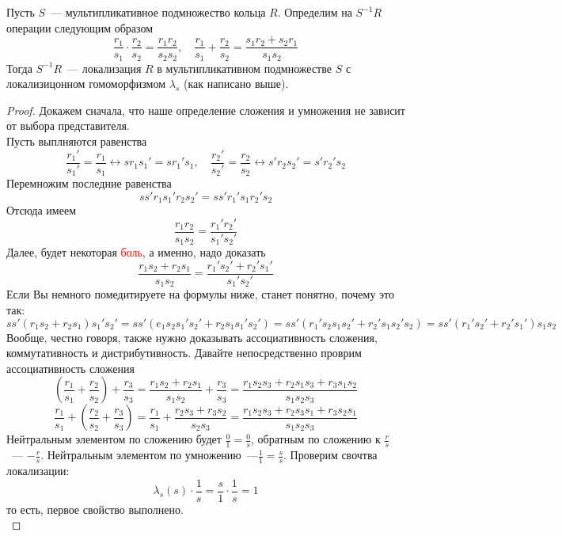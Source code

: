 \documentclass[11pt]{report}
\begin{document}
    \begin{theorem}
        Пусть $S$~--- мультипликативное подмножество кольца $R$. Определим на $S^{-1}R$ операции следующим образом
        \[ \frac{r_1}{s_1} \cdot \frac{r_2}{s_2} = \frac{r_1 r_2}{s_2 s_2}, \quad \frac{r_1}{s_1} + \frac{r_2}{s_2} = \frac{s_1 r_2 + s_2 r_1}{s_1 s_2} \]
        Тогда $S^{-1}R$~--- локализация $R$ в мультипликативном подмножестве $S$ с локализицонном гомоморфизмом $\lambda_s$ (как написано выше).
    \end{theorem}
    \begin{proof}
        Докажем сначала, что наше определение сложения и умножения не зависит от выбора представителя. \\
        Пусть выплняются равенства
        \[ \frac{r_1'}{s_1'} = \frac{r_1}{s_1} \leftrightarrow s r_1 s_1' = s r_1' s_1, \quad \frac{r_2'}{s_2'} = \frac{r_2}{s_2} \leftrightarrow s' r_2 s_2' = s' r_2' s_2 \]
        Перемножим последние равенства
        \[ s s' r_1 s_1' r_2 s_2' = s s' r_1' s_1 r_2' s_2 \]
        Отсюда имеем
        \[ \frac{r_1 r_2}{s_1 s_2} = \frac{r_1' r_2'}{s_1' s_2'} \]
        Далее, будет некоторая \textcolor{red}{боль}, а именно, надо доказать
        \[ \frac{r_1 s_2 + r_2 s_1}{s_1 s_2} = \frac{r_1' s_2' + r_2' s_1' }{s_1' s_2'} \]
        Если Вы немного помедитируете на формулы ниже, станет понятно, почему это так:
        \[ ss' (r_1 s_2 + r_2 s_1) s_1' s_2' = s s' (e_1 s_2 s_1' s_2' + r_2 s_1 s_1' s_2') =
        s s' (r_1' s_2 s_1 s_2' + r_2' s_1 s_2' s_2) = s s' (r_1' s_2' + r_2' s_1') s_1 s_2 \]
        Вообще, честно говоря, также нужно доказывать ассоциативность сложения, коммутативность и дистрибутивность.
        Давайте непосредственно проврим ассоциативность сложения
        \[ \left( \frac{r_1}{s_1} + \frac{r_2}{s_2} \right) + \frac{r_3}{s_3} = \frac{r_1 s_2 + r_2 s_1}{s_1 s_2} + \frac{r_3}{s_3} = \frac{r_1 s_2 s_3 + r_2 s_1 s_3 + r_3 s_1 s_2}{s_1 s_2 s_3} \]
        \[ \frac{r_1}{s_1} + \left( \frac{r_2}{s_2} + \frac{r_3}{s_3} \right) = \frac{r_1}{s_1} + \frac{r_2 s_3 + r_3 s_2}{s_2 s_3} = \frac{r_1 s_2 s_3 + r_2 s_3 s_1 + r_3 s_2 s_1}{s_1 s_2 s_3}\]
        Нейтральным элементом по сложению будет $\frac{0}{1} = \frac{0}{s}$, обратным по сложению к $\frac{r}{s}$~--- $-\frac{r}{s}$.
        Нейтральным элементом по умножению~---$\frac{1}{1} = \frac{s}{s}$. Проверим свочтва локализации:
        \[ \lambda_s(s) \cdot \frac{1}{s} = \frac{s}{1} \cdot \frac{1}{s} = 1 \]
        то есть, первое свойство выполнено. \\


\end{proof}
\end{document}
